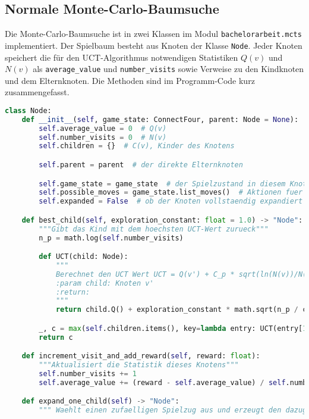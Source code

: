 \subsection{Normale Monte-Carlo-Baumsuche}
\label{subsec:normale-monte-carlo-baumsuche}

Die Monte-Carlo-Baumsuche ist in zwei Klassen im Modul \verb|bachelorarbeit.mcts| implementiert.
Der Spielbaum besteht aus Knoten der Klasse \verb|Node|.
Jeder Knoten speichert die für den UCT-Algorithmus notwendigen Statistiken $Q(v)$ und $N(v)$ als \verb|average_value| und \verb|number_visits| sowie Verweise zu den Kindknoten und dem Elternknoten.
Die Methoden sind im Programm-Code kurz zusammengefasst.

\begin{lstlisting}[language=Python,caption=Der Knoten der Monte-Carlo-Baumsuche,label={lst:mcts-node}]
class Node:
    def __init__(self, game_state: ConnectFour, parent: Node = None):
        self.average_value = 0  # Q(v)
        self.number_visits = 0  # N(v)
        self.children = {}  # C(v), Kinder des Knotens

        self.parent = parent  # der direkte Elternknoten

        self.game_state = game_state  # der Spielzustand in diesem Knoten
        self.possible_moves = game_state.list_moves()  # Aktionen fuer die noch nicht erforschten Kindknoten
        self.expanded = False  # ob der Knoten vollstaendig expandiert ist

    def best_child(self, exploration_constant: float = 1.0) -> "Node":
        """Gibt das Kind mit dem hoechsten UCT-Wert zurueck"""
        n_p = math.log(self.number_visits)

        def UCT(child: Node):
            """
            Berechnet den UCT Wert UCT = Q(v') + C_p * sqrt(ln(N(v))/N(v'))
            :param child: Knoten v'
            :return:
            """
            return child.Q() + exploration_constant * math.sqrt(n_p / child.number_visits)

        _, c = max(self.children.items(), key=lambda entry: UCT(entry[1]))
        return c

    def increment_visit_and_add_reward(self, reward: float):
        """Aktualisiert die Statistik dieses Knotens"""
        self.number_visits += 1
        self.average_value += (reward - self.average_value) / self.number_visits

    def expand_one_child(self) -> "Node":
        """ Waehlt einen zufaelligen Spielzug aus und erzeugt den dazugehoerigen Kindknoten"""

\end{lstlisting}

